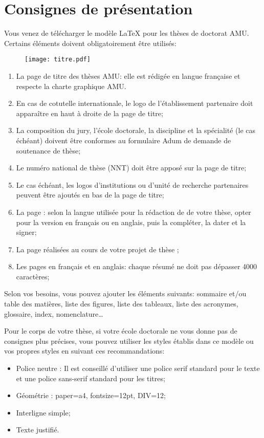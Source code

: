 \chapter{Consignes de présentation}
\label{chap:consignes}

Vous venez de télécharger le modèle LaTeX pour les thèses de doctorat AMU.
Certains éléments doivent obligatoirement être utilisés:
\\


\begin{figure}[h!tbp]
	\centering
	\texttt{[image: titre.pdf]}
\end{figure}

\begin{enumerate}
	\item La page de titre des thèses AMU: elle est rédigée en langue française et respecte la charte graphique AMU.
	\item En cas de cotutelle internationale, le logo de l’établissement partenaire doit apparaître en haut à droite de la page de titre;
	\item La composition du jury, l’école doctorale, la discipline et la spécialité (le cas échéant) doivent être conformes au formulaire Adum de demande de soutenance de thèse;
	\item Le numéro national de thèse (NNT) doit être apposé sur la page de titre;
	\item Le cas échéant, les logos d’institutions ou d’unité de recherche partenaires peuvent être ajoutés en bas de la page de titre;
	\item La page : selon la langue utilisée pour la rédaction de de votre thèse, opter pour la version en français ou en anglais, puis la compléter, la dater et la signer;
	\item La page  réalisées au cours de votre projet de thèse ;
	\item Les pages  en français et  en anglais: chaque résumé ne doit pas dépasser 4000 caractères;
\end{enumerate}

Selon vos besoins, vous pouvez ajouter les éléments suivants: sommaire et/ou table des matières, liste des figures, liste des tableaux, liste des acronymes, glossaire, index, nomenclature…

Pour le corps de votre thèse, si votre école doctorale ne vous donne pas de consignes plus précises, vous pouvez utiliser les styles établis dans ce modèle ou vos propres styles en suivant ces recommandations:
\begin{itemize}
	\item Police neutre : Il est conseillé d'utiliser une police serif standard pour le texte et une police sans-serif standard pour les titres;
	\item Géométrie : paper=a4, fontsize=12pt, DIV=12;
	\item Interligne simple;
	\item Texte justifié.
\end{itemize}

